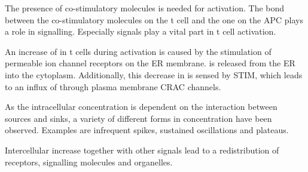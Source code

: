 The presence of co-stimulatory molecules is needed for activation. The bond between the co-stimulatory molecules on the t cell and the one on the APC plays a role in signalling. Especially \Calcium signals play a vital part in t cell activation.

An increase of \Calcium in t cells during activation is caused by the stimulation of \Calcium permeable ion channel receptors on the ER membrane. \Calcium is released from the ER into the cytoplasm. Additionally, this decrease in \Calcium is sensed by STIM, which leads to an influx of \Calcium through plasma membrane CRAC channels.\cite{smith2009}

As the intracellular \Calcium concentration is dependent on the interaction between \Calcium sources and sinks, a variety of different forms in \Calcium concentration have been observed. Examples are infrequent spikes, sustained oscillations and plateaus.\cite{Lewis2001}

Intercellular \Calcium increase together with other signals lead to a redistribution of receptors, signalling molecules and organelles.\cite{joseph2014}